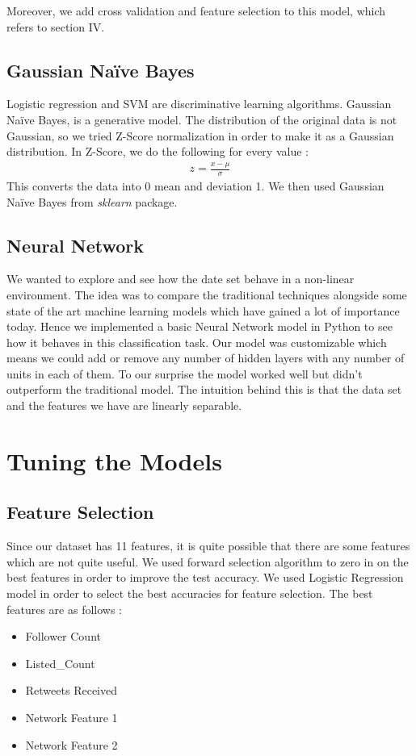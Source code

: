 \documentclass[conference]{IEEEtran}
\numberwithin{equation}{section}
\numberwithin{figure}{section}
\numberwithin{table}{section}
\begin{document}
Moreover, we add cross validation and feature
selection to this model, which refers to section IV.

\subsection{Gaussian Na{\"i}ve Bayes}\label{sec:colour-illustrations}
Logistic regression and SVM are discriminative learning algorithms. Gaussian Na{\"i}ve Bayes, is a generative model. The distribution of the original data is not Gaussian, so we tried Z-Score normalization in order to make it as a Gaussian distribution. In Z-Score, we do the following for every value : 
\begin{align*}
z = \frac{x - \mu}{\sigma}
\end{align*}
This converts the data into 0 mean and deviation 1. We then used Gaussian Na{\"i}ve Bayes from \textit{sklearn} package.

\subsection{Neural Network}\label{sec:colour-illustrations}
We wanted to explore and see how the date set behave in a non-linear environment. The idea was to compare the traditional techniques alongside some state of the art machine learning models which have gained a lot of importance today. Hence we implemented a basic Neural Network model in Python to see how it behaves in this classification task. Our model was customizable which means we could add or remove any number of hidden layers with any number of units in each of them. To our surprise the model worked well but didn't outperform the traditional model. The intuition behind this is that the data set and the features we have are linearly separable. 

\section{Tuning the Models}
\subsection{Feature Selection}
Since our dataset has 11 features, it is quite possible that there are some features which are not quite useful. We used forward selection algorithm to zero in on the best features in order to improve the test accuracy. We used Logistic Regression model in order to select the best accuracies for feature selection. The best features are as follows :
\begin{itemize}
\item Follower Count
\item Listed\_Count
\item Retweets Received
\item Network Feature 1
\item Network Feature 2
\end{itemize}
\end{document}

